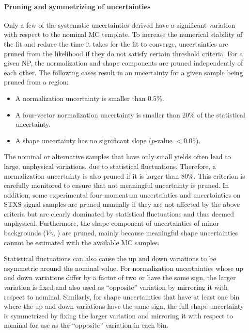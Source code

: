 \paragraph{Pruning and symmetrizing of uncertainties}
Only a few of the systematic uncertainties derived have a significant variation with respect to the nominal MC template. To increase the numerical stability of the fit and reduce the time it takes for the fit to converge, uncertainties are pruned from the likelihood if they do not satisfy certain threshold criteria.
For a given NP, the normalization and shape components are pruned independently of each other.
The following cases result in an uncertainty for a given sample being pruned from a region:
\begin{itemize}
    \item A normalization uncertainty is smaller than 0.5\%.
    \item A four-vector normalization uncertainty is smaller than 20\% of the statistical uncertainty. 
    \item A shape uncertainty has no significant slope ($p$-value $< 0.05$).
\end{itemize}
The nominal or alternative samples that have only small yields often lead to large, unphysical variations, due to statistical fluctuations. 
Therefore, a normalization uncertainty is also pruned if it is larger than 80\%. 
This criterion is carefully monitored to ensure that not meaningful uncertainty is pruned.
In addition, some experimental four-momentum uncertainties and uncertainties on STXS signal samples are pruned manually if they are not affected by the above criteria but are clearly dominated by statistical fluctuations and thus deemed unphysical.
Furthermore, the shape component of uncertainties of minor backgrounds ($V\gamma$, \Zgamma) are pruned, mainly because meaningful shape uncertainties cannot be estimated with the available MC samples. 

Statistical fluctuations can also cause the up and down variations to be asymmetric around the nominal value. 
For normalization uncertainties whose up and down variations differ by a factor of two or have the same sign, the larger variation is fixed and also used as ``opposite'' variation by mirroring it with respect to nominal.
Similarly, for shape uncertainties that have at least one bin where the up and down variations have the same sign, the full shape uncertainty is symmetrized by fixing the larger variation and mirroring it with respect to nominal for use as the ``opposite'' variation in each bin.

